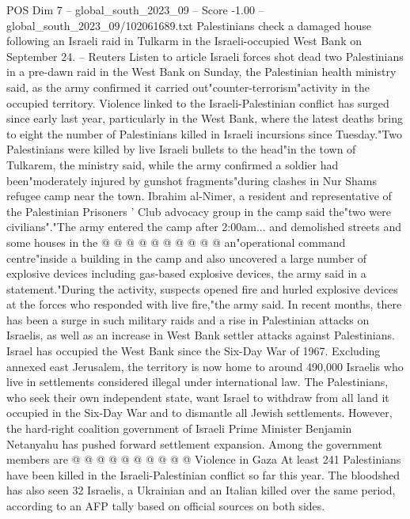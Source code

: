 \begin{textsample}{POS Dim 7 – global\_south\_2023\_09 – Score -1.00 – global\_south\_2023\_09/102061689.txt}  \label{ex:f7_pos_008}
Palestinians check a damaged house following an Israeli raid in Tulkarm in the Israeli-occupied West Bank on September 24. -- Reuters Listen to article Israeli forces shot dead two Palestinians in a pre-dawn raid in the West Bank on Sunday, the Palestinian health ministry said, as the army confirmed it carried out"counter-terrorism"activity in the occupied territory.
Violence linked to the Israeli-Palestinian conflict has surged since early last year, particularly in the West Bank, where the latest deaths bring to eight the number of Palestinians killed in Israeli incursions since Tuesday."Two Palestinians were killed by live Israeli bullets to the head"in the town of Tulkarem, the ministry said, while the army confirmed a soldier had been"moderately injured by gunshot fragments"during clashes in Nur Shams refugee camp near the town.
Ibrahim al-Nimer, a resident and representative of the Palestinian Prisoners ' Club advocacy group in the camp said the"two were civilians"."The army entered the camp after 2:00am... and demolished streets and some houses in the @ @ @ @ @ @ @ @ @ @ an"operational command centre"inside a building in the camp and also uncovered a large number of explosive devices including gas-based explosive devices, the army said in a statement."During the activity, suspects opened fire and hurled explosive devices at the forces who responded with live fire,"the army said.
In recent months, there has been a surge in such military raids and a rise in Palestinian attacks on Israelis, as well as an increase in West Bank settler attacks against Palestinians.
Israel has occupied the West Bank since the Six-Day War of 1967.
Excluding annexed east Jerusalem, the territory is now home to around 490,000 Israelis who live in settlements considered illegal under international law.
The Palestinians, who seek their own independent state, want Israel to withdraw from all land it occupied in the Six-Day War and to dismantle all Jewish settlements.
However, the hard-right coalition government of Israeli Prime Minister Benjamin Netanyahu has pushed forward settlement expansion.
Among the government members are @ @ @ @ @ @ @ @ @ @ Violence in Gaza At least 241 Palestinians have been killed in the Israeli-Palestinian conflict so far this year.
The bloodshed has also seen 32 Israelis, a Ukrainian and an Italian killed over the same period, according to an AFP tally based on official sources on both sides.

\end{textsample}
